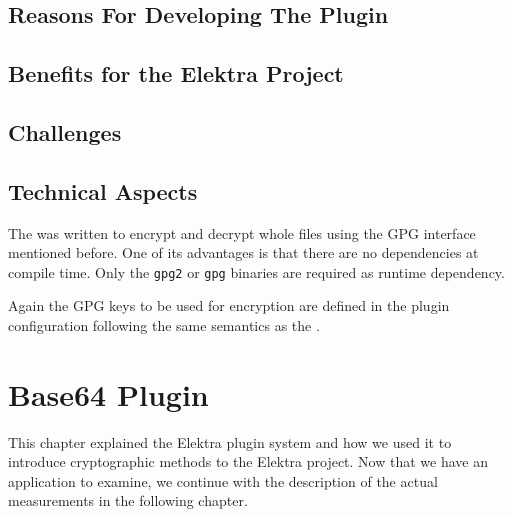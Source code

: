 \subsection{Reasons For Developing The Plugin}


\subsection{Benefits for the Elektra Project}


\subsection{Challenges}


\subsection{Technical Aspects}



The \fcrypt{} was written to encrypt and decrypt whole files using the GPG interface mentioned before.
One of its advantages is that there are no dependencies at compile time.
Only the \texttt{gpg2} or \texttt{gpg} binaries are required as runtime dependency.

Again the GPG keys to be used for encryption are defined in the plugin configuration following the same semantics as the \crypto{}.


\section{Base64 Plugin}\label{base64-plugin}


This chapter explained the Elektra plugin system and how we used it to introduce cryptographic methods to the Elektra project.
Now that we have an application to examine, we continue with the description of the actual measurements in the following chapter.
